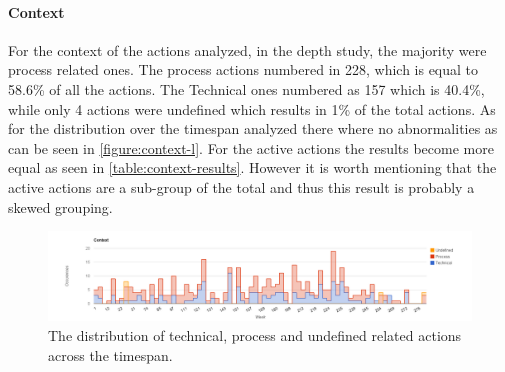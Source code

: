 \paragraph{Context}
For the context of the actions analyzed, in the depth study, the majority were process related ones. The process actions numbered in 228, which is equal to 58.6\% of all the actions. The Technical ones numbered as 157 which is 40.4\%, while only 4 actions were undefined which results in 1\% of the total actions. As for the distribution over the timespan analyzed there where no abnormalities as can be seen in \autoref{figure:context-l}. For the active actions the results become more equal as seen in \autoref{table:context-results}. However it is worth mentioning that the active actions are a sub-group of the total and thus this result is probably a skewed grouping. 

\begin{table}[!h]
	\begin{center}
	\caption{Analysis results from the content analysis for the context of the action.}
	\label{table:context-results}
	\end{center}
\end{table}

\begin{figure}
	\centering
	\includegraphics[width=\textwidth, keepaspectratio]{figures/context-l.png}
	\caption{The distribution of technical, process and undefined related actions across the timespan.}
	\label{figure:context-l}
\end{figure}

